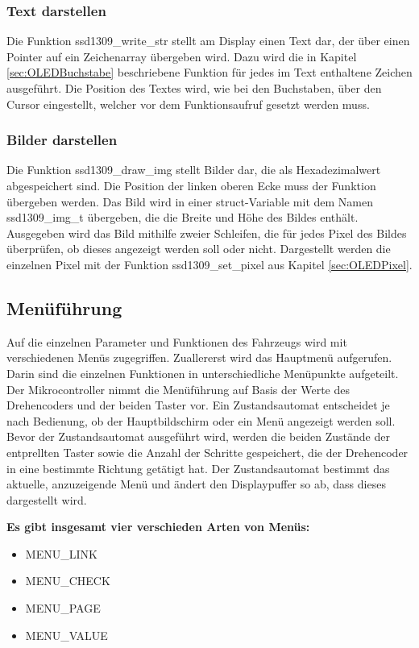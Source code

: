 \subsubsection{Text darstellen}\label{sec:OLEDText}
Die Funktion \glqq ssd1309\_write\_str\grqq{} stellt am Display einen Text dar, der über einen Pointer auf ein Zeichenarray übergeben wird. Dazu wird die in Kapitel \ref{sec:OLEDBuchstabe} beschriebene Funktion für jedes im Text enthaltene Zeichen ausgeführt. Die Position des Textes wird, wie bei den Buchstaben, über den Cursor eingestellt, welcher vor dem Funktionsaufruf gesetzt werden muss.

\subsubsection{Bilder darstellen}\label{sec:OLEDBild}
Die Funktion \glqq ssd1309\_draw\_img\grqq{} stellt Bilder dar, die als Hexadezimalwert abgespeichert sind. Die Position der linken oberen Ecke muss der Funktion übergeben werden. Das Bild wird in einer \glqq struct\grqq{}-Variable mit dem Namen \glqq ssd1309\_img\_t\grqq{} übergeben, die die Breite und Höhe des Bildes enthält. Ausgegeben wird das Bild mithilfe zweier Schleifen, die für jedes Pixel des Bildes überprüfen, ob dieses angezeigt werden soll oder nicht. Dargestellt werden die einzelnen Pixel mit der Funktion \glqq ssd1309\_set\_pixel\grqq{} aus Kapitel \ref{sec:OLEDPixel}.

\subsection{Menüführung}\label{sec:OLEDMenu}
Auf die einzelnen Parameter und Funktionen des Fahrzeugs wird mit verschiedenen Menüs zugegriffen. Zuallererst wird das Hauptmenü aufgerufen. Darin sind die einzelnen Funktionen in unterschiedliche Menüpunkte aufgeteilt. Der Mikrocontroller nimmt die Menüführung auf Basis der Werte des Drehencoders und der beiden Taster vor. Ein Zustandsautomat entscheidet je nach Bedienung, ob der Hauptbildschirm oder ein Menü angezeigt werden soll. Bevor der Zustandsautomat ausgeführt wird, werden die beiden Zustände der entprellten Taster sowie die Anzahl der Schritte gespeichert, die der Drehencoder in eine bestimmte Richtung getätigt hat. Der Zustandsautomat bestimmt das aktuelle, anzuzeigende Menü und ändert den Displaypuffer so ab, dass dieses dargestellt wird.\vspace{11pt}

\textbf{Es gibt insgesamt vier verschieden Arten von Menüs:}
\begin{itemize}
\item MENU\_LINK
\item MENU\_CHECK
\item MENU\_PAGE
\item MENU\_VALUE
\end{itemize}

